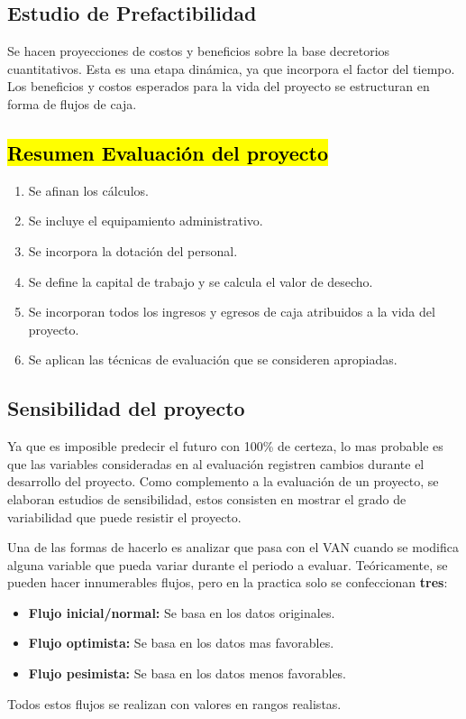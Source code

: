\documentclass{templateNote}
\begin{document}
\subsection*{Estudio de Prefactibilidad}

Se hacen proyecciones de costos y beneficios sobre la base decretorios cuantitativos. Esta es una etapa dinámica, ya que incorpora el factor del tiempo. Los beneficios y costos esperados para la vida del proyecto se estructuran en forma de flujos de caja.

\subsection*{\hl{Resumen Evaluación del proyecto}}
\begin{enumerate}
    \item Se afinan los cálculos.
    \item Se incluye el equipamiento administrativo.
    \item Se incorpora la dotación del personal.
    \item Se define la capital de trabajo y se calcula el valor de desecho.
    \item Se incorporan todos los ingresos y egresos de caja atribuidos a la vida del proyecto.
    \item Se aplican las técnicas de evaluación que se consideren apropiadas.
\end{enumerate}

\subsection*{Sensibilidad del proyecto}
Ya que es imposible predecir el futuro con 100\% de certeza, lo mas probable es que las variables consideradas en al evaluación registren cambios durante el desarrollo del proyecto.
Como complemento a la evaluación de un proyecto, se elaboran estudios de sensibilidad, estos consisten en mostrar el grado de variabilidad que puede resistir el proyecto.

Una de las formas de hacerlo es analizar que pasa con el VAN cuando se modifica alguna variable que pueda variar durante el periodo a evaluar. Teóricamente, se pueden hacer innumerables flujos, pero en la practica solo se confeccionan \textbf{tres}:
\begin{itemize}
    \item \textbf{Flujo inicial/normal:} Se basa en los datos originales.
    \item \textbf{Flujo optimista:} Se basa en los datos mas favorables.
    \item \textbf{Flujo pesimista:} Se basa en los datos menos favorables.
\end{itemize}
Todos estos flujos se realizan con valores en rangos realistas.
\end{document}
